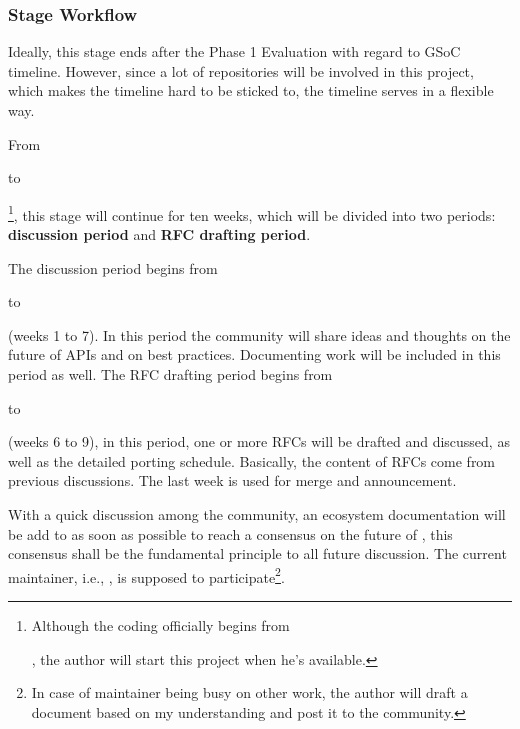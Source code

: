 \subsubsection*{Stage Workflow}

Ideally, this stage ends after the \textsf{Phase 1 Evaluation} with regard to GSoC timeline. However, since a lot of repositories will be involved in this project, which makes the timeline hard to be sticked to, the timeline serves in a flexible way.\par

From \date{April 22} to \date{June 24}\footnote{Although the coding officially begins from \date{May 27}, the author will start this project when he's available.}, this stage will continue for ten weeks, which will be divided into two periods: \textbf{discussion period} and \textbf{RFC drafting period}.\par

The discussion period begins from \date{April 22} to \date{June 3} (weeks 1 to 7). In this period the community will share ideas and thoughts on the future of APIs and on best practices. Documenting work will be included in this period as well. The RFC drafting period begins from \date{June 3} to \date{June 24} (weeks 6 to 9), in this period, one or more RFCs will be drafted and discussed, as well as the detailed porting schedule. Basically, the content of RFCs come from previous discussions. The last week is used for merge and announcement.\par

With a quick discussion among the community, an ecosystem documentation will be add to \repoimagesgithubio{} as soon as possible to reach a consensus on the future of \images{}, this consensus shall be the fundamental principle to all future discussion. The current \images{} maintainer, i.e., \timholy, is supposed to participate\footnote{In case of maintainer being busy on other work, the author will draft a document based on my understanding and post it to the community.}.\par

